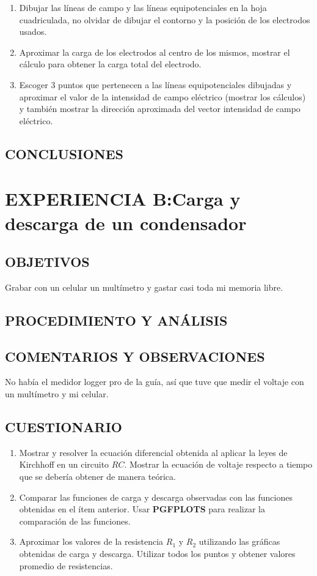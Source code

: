 \documentclass[10pt, twoside]{article}
\begin{document}
\begin{enumerate}[label=\roman*]
	\item Dibujar las líneas de campo y las líneas equipotenciales en la hoja
		cuadriculada, no olvidar de dibujar el contorno y la posición de los
		electrodos usados.
	\item Aproximar la carga de los electrodos al centro de los mismos,
		mostrar el cálculo para obtener la carga total del electrodo.
	\item Escoger $3$ puntos que pertenecen a las líneas equipotenciales
		dibujadas y aproximar el valor de la intensidad de campo
		eléctrico (mostrar los cálculos) y también mostrar la dirección
		aproximada del vector intensidad de campo eléctrico.
\end{enumerate}

\subsection{CONCLUSIONES}%


\section{EXPERIENCIA B:Carga y descarga de un condensador}%

\subsection{OBJETIVOS}%

Grabar con un celular un multímetro y gastar casi toda mi
memoria libre.

\subsection{PROCEDIMIENTO Y ANÁLISIS}%

\subsection{COMENTARIOS Y OBSERVACIONES}%

No había el medidor logger pro de la guía,
así que tuve que medir el voltaje con un multímetro y mi celular.

\subsection{CUESTIONARIO}%
\begin{enumerate}[label=\roman*]
	\item Mostrar y resolver la ecuación diferencial obtenida al aplicar la
		leyes de Kirchhoff en un circuito $RC$.
		Mostrar la ecuación de voltaje respecto a tiempo que se debería
		obtener de manera teórica.
	\item Comparar las funciones de carga y descarga observadas con las
		funciones obtenidas en el ítem anterior.
		Usar \textbf{PGFPLOTS} para realizar la comparación de las funciones.
	\item Aproximar los valores de la resistencia $R_1$ y $R_2$ utilizando
		las gráficas obtenidas de carga y descarga.
		Utilizar todos los puntos y obtener valores promedio de resistencias.
\end{enumerate}
\end{document}

